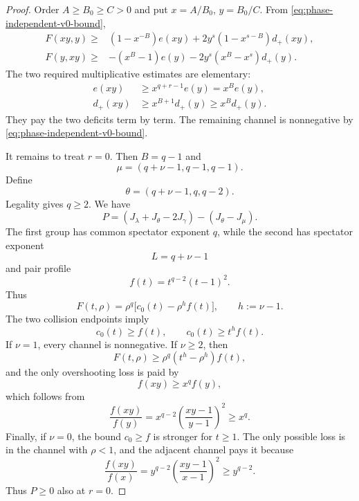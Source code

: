 \documentclass[11pt]{article}
\theoremstyle{definition}
\begin{document}
\begin{proof}
Order \(A\ge B_0\ge C>0\) and put \(x=A/B_0\), \(y=B_0/C\).  From \eqref{eq:phase-independent-v0-bound},
\begin{align*}
F(xy,y)\ge{}&
(1-x^{-B})e(xy)
+2y^s(1-x^{s-B})d_+(xy),\\
F(y,xy)\ge{}&
-(x^B-1)e(y)
-2y^s(x^B-x^s)d_+(y).
\end{align*}
The two required multiplicative estimates are elementary:
\begin{align*}
e(xy)
&\ge x^{q+r-1}e(y)=x^B e(y),\\
d_+(xy)
&\ge x^{B+1}d_+(y)
\ge x^B d_+(y).
\end{align*}
They pay the two deficits term by term.  The remaining channel is nonnegative by \eqref{eq:phase-independent-v0-bound}.

It remains to treat \(r=0\).  Then \(B=q-1\) and
\begin{equation*}
\mu=(q+\nu-1,q-1,q-1).
\end{equation*}
Define
\begin{equation*}
\theta=(q+\nu-1,q,q-2).
\end{equation*}
Legality gives \(q\ge2\).  We have
\begin{equation*}
P=(J_\lambda+J_\theta-2J_\gamma)-(J_\theta-J_\mu).
\end{equation*}
The first group has common spectator exponent \(q\), while the second has spectator exponent
\begin{equation*}
L=q+\nu-1
\end{equation*}
and pair profile
\begin{equation*}
f(t)=t^{q-2}(t-1)^2.
\end{equation*}
Thus
\begin{equation*}
F(t,\rho)=\rho^q\bigl[c_0(t)-\rho^h f(t)\bigr],
\qquad
h:=\nu-1.
\end{equation*}
The two collision endpoints imply
\begin{equation*}
c_0(t)\ge f(t),
\qquad
c_0(t)\ge t^h f(t).
\end{equation*}
If \(\nu=1\), every channel is nonnegative.  If \(\nu\ge2\), then
\begin{equation*}
F(t,\rho)\ge\rho^q(t^h-\rho^h)f(t),
\end{equation*}
and the only overshooting loss is paid by
\begin{equation*}
f(xy)\ge x^q f(y),
\end{equation*}
which follows from
\begin{equation*}
\frac{f(xy)}{f(y)}
=x^{q-2}\left(\frac{xy-1}{y-1}\right)^2
\ge x^q.
\end{equation*}
Finally, if \(\nu=0\), the bound \(c_0\ge f\) is stronger for \(t\ge1\).  The only possible loss is in the channel with \(\rho<1\), and the adjacent channel pays it because
\begin{equation*}
\frac{f(xy)}{f(x)}
=y^{q-2}\left(\frac{xy-1}{x-1}\right)^2
\ge y^{q-2}.
\end{equation*}
Thus \(P\ge0\) also at \(r=0\).
\end{proof}
\end{document}
